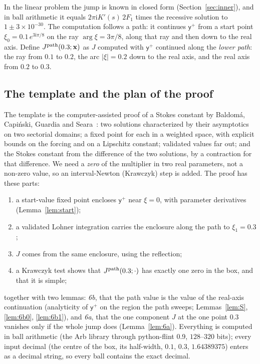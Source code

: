 \documentclass{amsart}
\numberwithin{equation}{section}
\theoremstyle{plain}
\theoremstyle{definition}
\theoremstyle{remark}
\newcommand{\bx}{\mathbf{x}}
\newcommand{\iu}{\mathrm{i}}
\begin{document}
In the linear problem the jump is known in closed form (Section~\ref{sec:inner}), and in ball arithmetic it equals
$2\pi\iu K'(s)\,2F_1$ times the recessive solution to $1 \pm 3\times10^{-30}$. The computation follows a path: it continues $\mathsf y^+$
from a start point $\xi_0 = 0.1\,e^{3\iu\pi/8}$ on the ray $\arg\xi = 3\pi/8$, along that ray and then down to the real axis.
Define $J^{\rm path}(0.3; \bx)$ as $J$ computed with $\mathsf y^+$ continued along the \emph{lower path}: the ray from $0.1$ to $0.2$,
the arc $|\xi| = 0.2$ down to the real axis, and the real axis from $0.2$ to $0.3$.

\subsection{The template and the plan of the proof}
The template is the computer-assisted proof of a Stokes constant by Baldom\'a, Capi\'nski, Guardia and
Seara~\cite{BaldomaCapinskiGuardiaSeara2023}: two solutions characterized by their asymptotics on two sectorial domains;
a fixed point for each in a weighted space, with explicit bounds on the forcing and on a Lipschitz constant; validated
values far out; and the Stokes constant from the difference of the two solutions, by a contraction for that difference.
We need a \emph{zero} of the multiplier in two real parameters, not a non-zero value, so an interval-Newton (Krawczyk) step
is added. The proof has these parts:
\begin{enumerate}[label=(\roman*),leftmargin=2em]
\item a start-value fixed point encloses $\mathsf y^+$ near $\xi = 0$, with parameter derivatives (Lemma~\ref{lem:start});
\item a validated Lohner integration carries the enclosure along the path to $\xi_1 = 0.3$;
\item $J$ comes from the same enclosure, using the reflection;
\item a Krawczyk test shows that $J^{\rm path}(0.3; \cdot)$ has exactly one zero in the box, and that it is simple;
\end{enumerate}
together with two lemmas: \emph{6b}, that the path value is the value of the real-axis continuation (analyticity of $\mathsf y^+$
on the region the path sweeps; Lemmas~\ref{lem:S}, \ref{lem:6b0}, \ref{lem:6b1}), and \emph{6a}, that the one component $J$
at the one point $0.3$ vanishes only if the whole jump does (Lemma~\ref{lem:6a}). Everything is computed in ball arithmetic
(the Arb library through python-flint 0.9, $128$--$320$ bits); every input decimal (the centre of the box, its half-width,
$0.1$, $0.3$, $1.64389375$) enters as a decimal string, so every ball contains the exact decimal.
\end{document}
